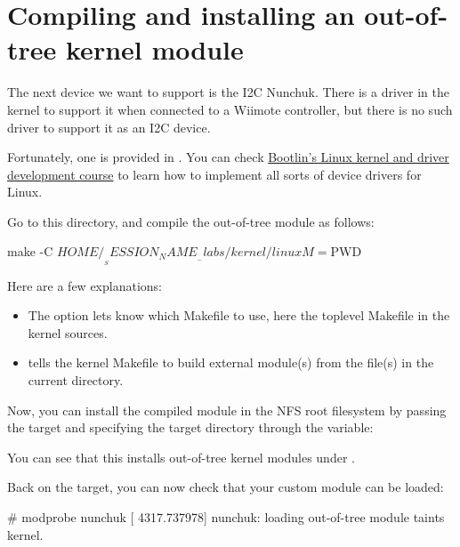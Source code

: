 {\section{Compiling and installing an out-of-tree kernel module}

The next device we want to support is the I2C Nunchuk. There is a driver
in the kernel to support it when connected to a Wiimote controller, but
there is no such driver to support it as an I2C device.

Fortunately, one is provided in
. You can check
\href{https://bootlin.com/training/kernel/}{Bootlin's Linux kernel and
driver development course} to learn how to implement all sorts of device
drivers for Linux.

Go to this directory, and compile the out-of-tree module as follows:

\begin{bashinput}
make -C $HOME/__SESSION_NAME__-labs/kernel/linux M=$PWD
\end{bashinput}

Here are a few explanations:
\begin{itemize}
\item The  option lets  know which Makefile to
      use, here the toplevel Makefile in the kernel sources.
\item {} tells the kernel Makefile to build external
      module(s) from the file(s) in the current directory.
\end{itemize}

Now, you can install the compiled module in the NFS root filesystem
by passing the  target and specifying the
target directory through the  variable:


You can see that this installs out-of-tree kernel modules under
.

Back on the target, you can now check that your custom module can
be loaded:

\begin{bashinput}
# modprobe nunchuk
[ 4317.737978] nunchuk: loading out-of-tree module taints kernel.
\end{bashinput}

}
